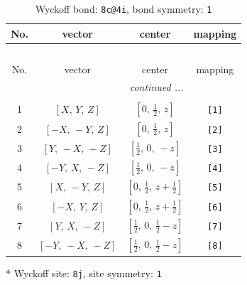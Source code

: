 \documentclass[fleqn,8pt]{jsarticle}
\begin{document}
\renewcommand{\arraystretch}{1.2}
\begin{longtable}{cccc}
\caption{Wyckoff bond: {\tt 8c@4i}, bond symmetry: {\tt 1}}
 \\
 \hline \hline
No. & vector & center & mapping \\ \hline \endfirsthead

\multicolumn{3}{l}{\tablename\ \thetable{}} \\
 \hline \hline
No. & vector & center & mapping \\ \hline \endhead

 \hline \hline
\multicolumn{3}{r}{\footnotesize\it continued ...} \\ \endfoot

 \hline \hline
\multicolumn{3}{r}{} \\ \endlastfoot

1 & $\left[ X,\, Y,\, Z \right]$ & $\left[ 0,\, \frac{1}{2},\, z \right]$ & {\tt [1]} \\ \hline
2 & $\left[ - X,\, - Y,\, Z \right]$ & $\left[ 0,\, \frac{1}{2},\, z \right]$ & {\tt [2]} \\ \hline
3 & $\left[ Y,\, - X,\, - Z \right]$ & $\left[ \frac{1}{2},\, 0,\, - z \right]$ & {\tt [3]} \\ \hline
4 & $\left[ - Y,\, X,\, - Z \right]$ & $\left[ \frac{1}{2},\, 0,\, - z \right]$ & {\tt [4]} \\ \hline
5 & $\left[ X,\, - Y,\, Z \right]$ & $\left[ 0,\, \frac{1}{2},\, z + \frac{1}{2} \right]$ & {\tt [5]} \\ \hline
6 & $\left[ - X,\, Y,\, Z \right]$ & $\left[ 0,\, \frac{1}{2},\, z + \frac{1}{2} \right]$ & {\tt [6]} \\ \hline
7 & $\left[ Y,\, X,\, - Z \right]$ & $\left[ \frac{1}{2},\, 0,\, \frac{1}{2} - z \right]$ & {\tt [7]} \\ \hline
8 & $\left[ - Y,\, - X,\, - Z \right]$ & $\left[ \frac{1}{2},\, 0,\, \frac{1}{2} - z \right]$ & {\tt [8]} \\
\end{longtable}
* Wyckoff site: {\tt 8j}, site symmetry: {\tt 1}
\renewcommand{\arraystretch}{1.2}
\end{document}
